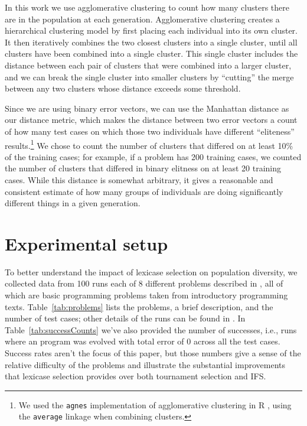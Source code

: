 In this work we use agglomerative clustering to count how many clusters there are in the population 
at each generation. Agglomerative clustering creates 
a hierarchical clustering model by first placing each individual into its own cluster. It then 
iteratively combines the two closest clusters into a single cluster, until all clusters have been 
combined into a single cluster. This single cluster includes the distance between each pair of clusters 
that were combined into a larger cluster, and we can break the single cluster into smaller clusters by
``cutting'' the merge between any two clusters whose distance exceeds some threshold.

Since we are using binary error vectors, we can use the 
Manhattan distance as our distance metric, which makes the distance between two error vectors
a count of how many test cases on which those two individuals have different ``eliteness'' 
results.\footnote{We used the \texttt{agnes} \citep{cluster} implementation of 
	agglomerative clustering in R \citep{R}, using the \texttt{average} linkage when 
	combining clusters.} 
We chose to count the number of clusters that differed on at least 10\% of the training cases; 
for example, if a problem has 200 training cases, we counted the number of clusters that differed 
in binary elitness on at least 20 training cases. While this distance is somewhat arbitrary, 
it gives a reasonable and consistent estimate of how many groups of individuals are doing 
significantly different things in a given generation.

\section{Experimental setup}
\label{sec:setup}

To better understand the impact of lexicase selection on population diversity, we collected data
from 100 runs each of 8 different problems described in \cite{Helmuth:2015:GECCO}, all of which are
basic programming problems taken from introductory programming texts. Table~\ref{tab:problems} lists
the problems, a brief description, and the number of test cases; other details of the runs can be
found in \cite{Helmuth:2015:GECCO}. In Table~\ref{tab:successCounts} we've also provided the number 
of successes, i.e., runs where an program was evolved with total error of 0 across all the test cases.
Success rates aren't the focus of this paper, but those numbers give a sense of the relative
difficulty of the problems and illustrate the substantial improvements that lexicase selection
provides over both tournament selection and IFS.

